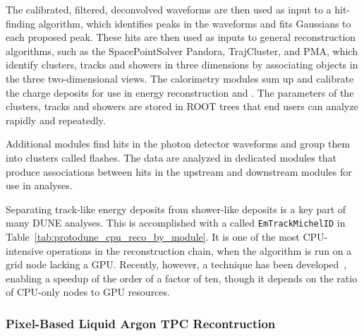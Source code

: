 \documentclass[../main-v1.tex]{subfiles}
\begin{document}
The calibrated, filtered, deconvolved waveforms are then used as input to a hit-finding algorithm, which identifies peaks in the waveforms and fits Gaussians to each proposed peak.  These hits are then used as inputs to general reconstruction algorithms, such as the SpacePointSolver Pandora, TrajCluster, and PMA, which identify clusters, tracks and showers in three dimensions by associating objects in the three two-dimensional views.  The calorimetry modules sum up and calibrate the charge deposits for use in energy reconstruction and .  The parameters of the clusters, tracks and showers are stored in ROOT trees that end users can analyze rapidly and repeatedly.

Additional modules find hits in the photon detector waveforms and group them into clusters called flashes.  The  data are analyzed in dedicated modules that produce associations between hits in the upstream and downstream  modules for use in analyses.

Separating track-like energy deposits from shower-like deposits is a key part of many DUNE analyses.  This is accomplished with a  called {\tt EmTrackMichelID} in Table~\ref{tab:protodune_cpu_reco_by_module}.  It is one of the most CPU-intensive operations in the  reconstruction chain, when the algorithm is run on a grid node lacking a GPU.  Recently, however, a  technique has been developed~\cite{Wang:2020fjr}, enabling a speedup of the order of a factor of ten, though it depends on the ratio of CPU-only nodes to GPU resources.


\subsubsection{Pixel-Based Liquid Argon TPC Recontruction}
\label{sec:algo:reco:lartpc:pixels}
\end{document}
